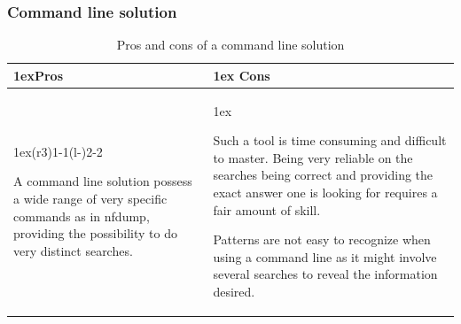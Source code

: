 \subsubsection{Command line solution}
\begin{table}[h!]
\begin{tabularx}{\linewidth}{>{\parskip1ex}X@{\kern4\tabcolsep}>{\parskip1ex}X}
\toprule
\hfil\bfseries Pros
&
\hfil\bfseries Cons
\\\cmidrule(r{3\tabcolsep}){1-1}\cmidrule(l{-\tabcolsep}){2-2}

A command line solution possess a wide range of very specific commands as in nfdump, providing the possibility to do very distinct searches.

&

Such a tool is time consuming and difficult to master. Being very reliable on the searches being correct and providing the exact answer one is looking for requires a fair amount of skill.

Patterns are not easy to recognize when using a command line as it might involve several searches to reveal the information desired. 

\\\bottomrule
\end{tabularx}
\caption{Pros and cons of a command line solution}
\end{table}